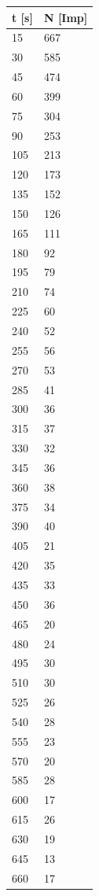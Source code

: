 \documentclass[titlepage=firstcover, captions=tableheading]{scrartcl}
\begin{document}
\begin{minipage}{\linewidth}
    \begin{table}[H]
        \centering
    
    \begin{tabular}{ll}
        \toprule
        t [s] & N [Imp] \\
        \midrule
        15 &	 667 \\
        30 &	 585 \\ 
        45 &	 474 \\
        60 &	 399 \\
        75 &	 304 \\
        90 &	 253 \\
        105	&    213 \\
        120	&    173 \\
        135	&    152 \\
        150	&    126 \\
        165	&    111 \\
        180	&     92 \\
        195	&     79 \\
        210	&     74 \\
        225	&     60 \\
        240	&     52 \\
        255	&     56 \\
        270	&     53 \\
        285	&     41 \\
        300	&     36 \\
        315	&     37 \\
        330	&     32 \\
        345	&     36 \\
        360	&     38 \\
        375	&     34 \\
        390	&     40 \\
        405	&     21 \\
        420	&     35 \\
        435	&     33 \\
        450	&     36 \\
        465	&     20 \\
        480	&     24 \\
        495	&     30 \\
        510	&     30 \\
        525	&     26 \\
        540	&     28 \\
        555	&     23 \\
        570	&     20 \\
        585	&     28 \\
        600	&     17 \\
        615	&     26 \\
        630	&     19 \\
        645	&     13 \\
        660	&     17 \\
        \bottomrule
        

\end{tabular}
\end{table}
\end{minipage}
\end{document}
